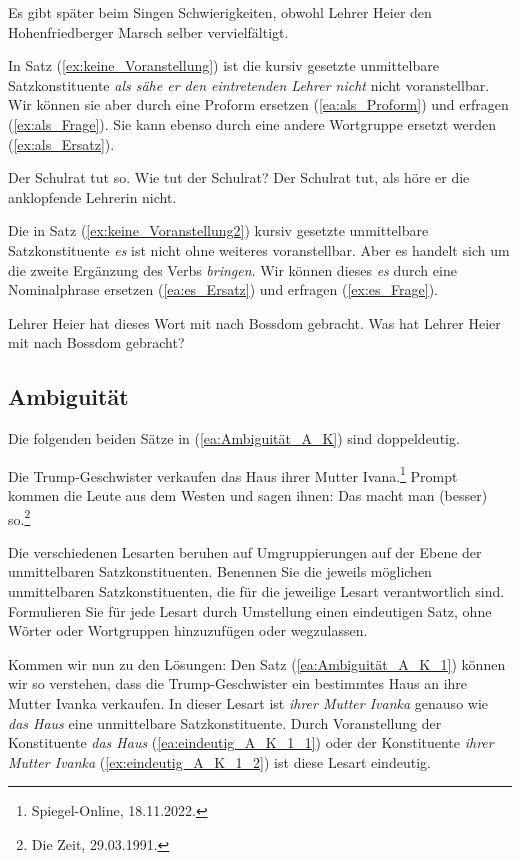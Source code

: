 \ea \label{ea:es_Vorfeld} Es gibt später beim Singen Schwierigkeiten, obwohl Lehrer Heier den Hohenfriedberger Marsch selber vervielfältigt. 
\z 

In Satz (\ref{ex:keine_Voranstellung}) ist die kursiv gesetzte unmittelbare Satzkonstituente \textit{als sähe er den eintretenden Lehrer nicht} nicht voranstellbar. Wir können sie aber durch eine Proform ersetzen (\ref{ea:als_Proform}) und erfragen (\ref{ex:als_Frage}). Sie kann ebenso durch eine andere Wortgruppe ersetzt werden (\ref{ex:als_Ersatz}).

\ea 
\ea \label{ea:als_Proform} Der Schulrat tut so.
\ex \label{ex:als_Frage} Wie tut der Schulrat?
\ex \label{ex:als_Ersatz} Der Schulrat tut, als höre er die anklopfende Lehrerin nicht.
\z 
\z 

Die in Satz (\ref{ex:keine_Voranstellung2}) kursiv gesetzte unmittelbare Satzkonstituente \textit{es} ist nicht ohne weiteres voranstellbar. Aber es handelt sich um die zweite Ergänzung des Verbs \textit{bringen}. Wir können dieses \textit{es} durch eine Nominalphrase ersetzen (\ref{ea:es_Ersatz}) und erfragen (\ref{ex:es_Frage}).

\ea 
\ea \label{ea:es_Ersatz} Lehrer Heier hat dieses Wort mit nach Bossdom gebracht. 
\ex \label{ex:es_Frage} Was hat Lehrer Heier mit nach Bossdom gebracht? 
\z 
\z  



\subsection{Ambiguität}\label{subsection:A_Konstituenz3}

Die folgenden beiden Sätze in (\ref{ea:Ambiguität_A_K}) sind doppeldeutig. 

\ea \label{ea:Ambiguität_A_K}
\ea \label{ea:Ambiguität_A_K_1} Die Trump-Geschwister verkaufen das Haus ihrer Mutter Ivana.\footnote{Spiegel-Online, 18.11.2022.} 
\ex \label{ea:Ambiguität_A_K_2} Prompt kommen die Leute aus dem Westen und sagen ihnen: Das macht man (besser) so.\footnote{Die Zeit, 29.03.1991.}
\z 
\z

Die verschiedenen Lesarten beruhen auf Umgruppierungen auf der Ebene der unmittelbaren Satzkonstituenten. Benennen Sie die jeweils möglichen unmittelbaren Satzkonstituenten, die für die jeweilige Lesart verantwortlich sind. Formulieren Sie für jede Lesart durch Umstellung einen eindeutigen Satz, ohne Wörter oder Wortgruppen hinzuzufügen oder wegzulassen. 


Kommen wir nun zu den Lösungen: Den Satz (\ref{ea:Ambiguität_A_K_1}) können wir so verstehen, dass die Trump-Geschwister ein bestimmtes Haus an ihre Mutter Ivanka verkaufen. In dieser Lesart ist \textit{ihrer Mutter Ivanka} genauso wie \textit{das Haus} eine unmittelbare Satzkonstituente. Durch Voranstellung der Konstituente \textit{das Haus} (\ref{ea:eindeutig_A_K_1_1}) oder der Konstituente \textit{ihrer Mutter Ivanka} (\ref{ex:eindeutig_A_K_1_2}) ist diese Lesart eindeutig.

